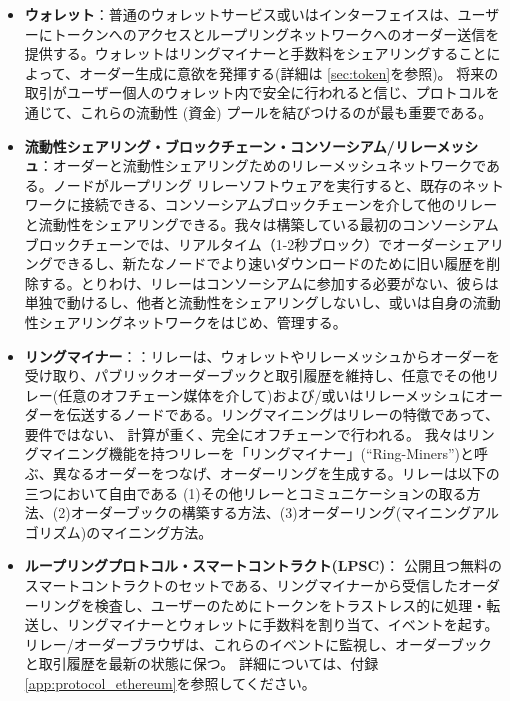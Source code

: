 \documentclass{article}
\begin{document}
\begin{multicols}{2}
\begin{itemize}

\item \textbf{ウォレット}：普通のウォレットサービス或いはインターフェイスは、ユーザーにトークンへのアクセスとループリングネットワークへのオーダー送信を提供する。ウォレットはリングマイナーと手数料をシェアリングすることによって、オーダー生成に意欲を発揮する(詳細は \ref{sec:token}を参照)。 将来の取引がユーザー個人のウォレット内で安全に行われると信じ、プロトコルを通じて、これらの流動性 (資金) プールを結びつけるのが最も重要である。

\item \textbf{流動性シェアリング・ブロックチェーン・コンソーシアム/リレーメッシュ}：オーダーと流動性シェアリングためのリレーメッシュネットワークである。ノードがループリング リレーソフトウェアを実行すると、既存のネットワークに接続できる、コンソーシアムブロックチェーンを介して他のリレーと流動性をシェアリングできる。我々は構築している最初のコンソーシアムブロックチェーンでは、リアルタイム（1-2秒ブロック）でオーダーシェアリングできるし、新たなノードでより速いダウンロードのために旧い履歴を削除する。とりわけ、リレーはコンソーシアムに参加する必要がない、彼らは単独で動けるし、他者と流動性をシェアリングしないし、或いは自身の流動性シェアリングネットワークをはじめ、管理する。

\item \textbf{リングマイナー}：：リレーは、ウォレットやリレーメッシュからオーダーを受け取り、パブリックオーダーブックと取引履歴を維持し、任意でその他リレー(任意のオフチェーン媒体を介して)および/或いはリレーメッシュにオーダーを伝送するノードである。リングマイニングはリレーの特徴であって、要件ではない、 計算が重く、完全にオフチェーンで行われる。 我々はリングマイニング機能を持つリレーを「リングマイナー」(\enquote{Ring-Miners})と呼ぶ、異なるオーダーをつなげ、オーダーリングを生成する。リレーは以下の三つにおいて自由である (1)その他リレーとコミュニケーションの取る方法、(2)オーダーブックの構築する方法、(3)オーダーリング(マイニングアルゴリズム)のマイニング方法。

\item \textbf{ループリングプロトコル・スマートコントラクト(LPSC)}：
公開且つ無料のスマートコントラクトのセットである、リングマイナーから受信したオーダーリングを検査し、ユーザーのためにトークンをトラストレス的に処理・転送し、リングマイナーとウォレットに手数料を割り当て、イベントを起す。 リレー/オーダーブラウザは、これらのイベントに監視し、オーダーブックと取引履歴を最新の状態に保つ。 詳細については、付録 \ref{app:protocol_ethereum}を参照してください。


\end{itemize}
\end{multicols}
\end{document}

